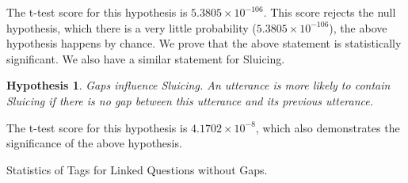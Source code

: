 \documentclass[bsc,frontabs,twoside,singlespacing,parskip,deptreport]{infthesis}     %
\newtheorem{hypo}{Hypothesis}[chapter]
\begin{document}
The t-test score for this hypothesis is $5.3805 \times 10^{-106}$. This score rejects the null hypothesis, which there is a very little probability ($5.3805 \times 10^{-106}$), the above hypothesis happens by chance. We prove that the above statement is statistically significant. We also have a similar statement for Sluicing.

\begin{hypo}
Gaps influence Sluicing. An utterance is more likely to contain Sluicing if there is no gap between this utterance and its previous utterance.
\end{hypo}

The t-test score for this hypothesis is $4.1702 \times 10^{-8}$, which also demonstrates the significance of the above hypothesis.

\begin{minipage}{\textwidth}


        \begin{minipage}[t]{0.45\textwidth}
            \centering
            \makeatletter{}\makeatother


\caption{Statistics of Tags for Linked Questions without Gaps.}
\label{tab:quegaplink}



\end{minipage}
\end{minipage}
\end{document}
